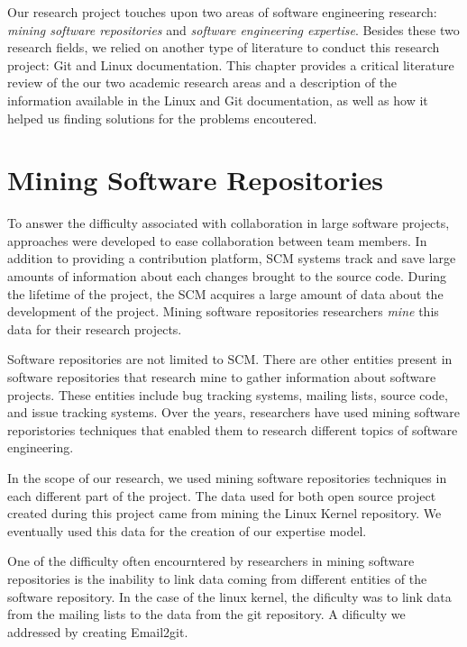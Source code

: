 \label{sec:RevLitt}


Our research project touches upon two areas of software engineering research: \textit{mining software repositories} and \textit{software engineering expertise}. Besides these two research fields, we relied on another type of literature to conduct this research project: Git and Linux documentation. This chapter provides a critical literature review of the our two academic research areas and a description of the information available in the Linux and Git documentation, as well as how it helped us finding solutions for the problems encoutered.



\section{Mining Software Repositories}

To answer the difficulty associated with collaboration in large software projects, approaches were developed to ease collaboration between team members. In addition to providing a contribution platform, \ac{SCM} systems track and save large amounts of information about each changes brought to the source code. During the lifetime of the project, the \ac{SCM} acquires a large amount of data about the development of the project. Mining software repositories researchers \textit{mine} this data for their research projects. 

Software repositories are not limited to \ac{SCM}. There are other entities present in software repositories that research mine to gather information about software projects. These entities include bug tracking systems, mailing lists, source code, and issue tracking systems. Over the years, researchers have used mining software reporistories techniques that enabled them to research different topics of software engineering. 

In the scope of our research, we used mining software repositories techniques in each different part of the project. The data used for both open source project created during this project came from mining the Linux Kernel repository. We eventually used this data for the creation of our expertise model.

One of the difficulty often encourntered by researchers in mining software repositories is the inability to link data coming from different entities of the software repository. In the case of the linux kernel, the dificulty was to link data from the mailing lists to the data from the git repository. A dificulty we addressed by creating Email2git.



